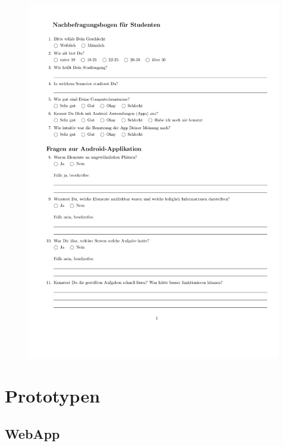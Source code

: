 \begin{figure}
  \vspace{-20pt}
  \begin{center}
    \includegraphics[page=3,width=0.99\textwidth]{./images/student}
  \end{center}
  \vspace{-40pt}
\end{figure}

\clearpage
\section{Prototypen}
\label{sec:prototypen}

\subsection{WebApp}

